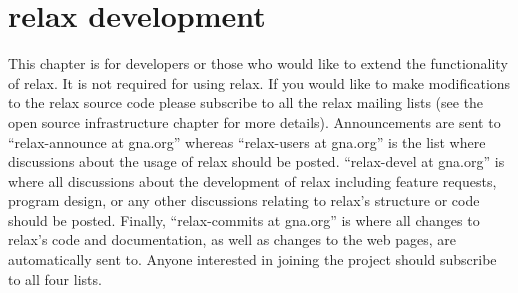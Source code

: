 


\chapter{relax development} \label{ch: relax devel}

This chapter is for developers or those who would like to extend the functionality of relax.
It is not required for using relax.
If you would like to make modifications to the relax source code please subscribe to all the relax mailing lists (see the open source infrastructure chapter for more details).
Announcements are sent to ``relax-announce at gna.org'' whereas ``relax-users at gna.org'' is the list where discussions about the usage of relax should be posted.
``relax-devel at gna.org'' is where all discussions about the development of relax including feature requests, program design, or any other discussions relating to relax's structure or code should be posted.
Finally, ``relax-commits at gna.org'' is where all changes to relax's code and documentation, as well as changes to the web pages, are automatically sent to.
Anyone interested in joining the project should subscribe to all four lists.



